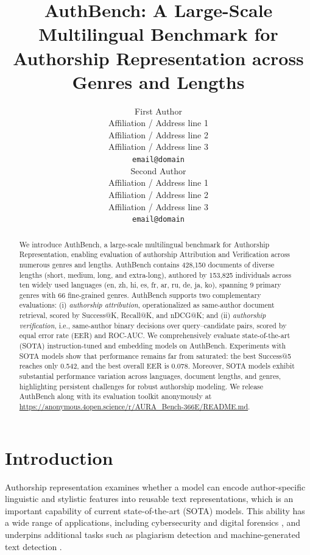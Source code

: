 \documentclass{article}
\title{AuthBench: A Large-Scale Multilingual Benchmark for Authorship Representation across Genres and Lengths}
\author{First Author \\
  Affiliation / Address line 1 \\
  Affiliation / Address line 2 \\
  Affiliation / Address line 3 \\
  \texttt{email@domain} \\\And
  Second Author \\
  Affiliation / Address line 1 \\
  Affiliation / Address line 2 \\
  Affiliation / Address line 3 \\
  \texttt{email@domain} \\}
\newcommand{\rev}[1]{#1}
\newcommand{\rededit}[1]{{\color{editred}#1}}
\begin{document}
\ifcolmsubmission
\linenumbers
\fi
\maketitle

\begin{abstract}
We introduce AuthBench, a large-scale multilingual benchmark for Authorship Representation, enabling evaluation of authorship Attribution and Verification across numerous genres and lengths. AuthBench contains \rededit{428,150 documents} of diverse lengths (short, medium, long, and extra-long), authored by \rededit{153,825 individuals} across ten widely used languages (en, zh, hi, es, fr, ar, ru, de, ja, ko), spanning \rededit{9 primary genres} with \rededit{66 fine-grained genres}. AuthBench supports two complementary evaluations: (i) \emph{authorship attribution}, operationalized as same-author document retrieval, scored by Success@K, Recall@K, and nDCG@K; and (ii) \emph{authorship verification}, i.e., same-author binary decisions over query--candidate pairs, scored by equal error rate (EER) \rev{and ROC-AUC}. We comprehensively evaluate state-of-the-art (SOTA) instruction-tuned and embedding models on AuthBench. Experiments with SOTA models show that performance remains far from saturated: the best Success@5 reaches only 0.542, and the best overall EER is 0.078. Moreover, SOTA models exhibit substantial performance variation across languages, document lengths, and genres, highlighting persistent challenges for robust authorship modeling. We release AuthBench along with its evaluation toolkit anonymously at \url{https://anonymous.4open.science/r/AURA_Bench-366E/README.md}.
\end{abstract}

\section{Introduction}
Authorship representation \cite{huang2025authorship,habib2025trends,tyo2022state} examines whether a model can encode author-specific linguistic and stylistic features into reusable text representations, which is an important capability of current state-of-the-art (SOTA) models. This ability has a wide range of applications, including cybersecurity and digital forensics \citep{abbasi2008writeprints,narayanan2012feasibility,kumar2017army,caliskan2015deanonymizing}, and underpins additional tasks such as plagiarism detection \citep{potthast2014panplagiarism,barron-cedeno-etal-2013-plagiarism} and machine-generated text detection \citep{przystalski2025stylometry,aityan2025lightweight,alshaibani2026arabic,martinek2024deepfakeads}.
\end{document}
